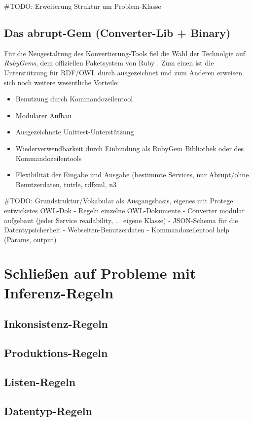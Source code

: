 \documentclass[runningheads,a4paper]{llncs}
\begin{document}
\#TODO: Erweiterung Struktur um Problem-Klasse

\subsection{Das abrupt-Gem (Converter-Lib + Binary)}
Für die Neugestaltung des Konvertierung-Tools fiel die Wahl der Technolgie auf \textit{RubyGems}, dem offiziellen Paketsystem von Ruby . 
Zum einen ist die Unterstützung für RDF/OWL durch \cite{ruby-rdf} ausgezeichnet und zum Anderen erweisen sich noch weitere wesentliche Vorteile:
\begin{itemize}
\item{Benutzung durch Kommandozeilentool}
\item{Modularer Aufbau}
\item{Ausgezeichnete Unittest-Unterstützung}
\item{Wiederverwendbarkeit durch Einbindung als RubyGem Bibliothek oder des Kommandozeilentools}
\item{Flexibilität der Eingabe und Ausgabe (bestimmte Services, nur Abrupt/ohne Benutzerdaten, tutrle, rdfxml, n3}
\end{itemize}

\#TODO: Grundstruktur/Vokabular als Ausgangsbasis, eigenes mit Protege entwicketes OWL-Dok
- Regeln einzelne OWL-Dokumente
- Converter modular aufgebaut (jeder Service readability, ... eigene Klasse)
- JSON-Schema für die Datentypsicherheit
- Webseiten-Benutzerdaten
- Kommandozeilentool help (Params, output)

\newpage

\section{Schließen auf Probleme mit Inferenz-Regeln}
\subsection{Inkonsistenz-Regeln}
\subsection{Produktions-Regeln}
\subsection{Listen-Regeln}
\subsection{Datentyp-Regeln}
\end{document}
